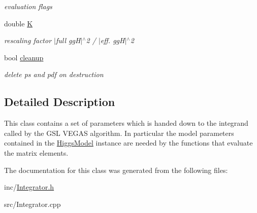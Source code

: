 \begin{DoxyCompactItemize}
\begin{DoxyCompactList}\small\item\em evaluation flags \end{DoxyCompactList}\item 
\hypertarget{classintegrand__par_afae7075055e10bd188d53fe2e1edd1e3}{double \hyperlink{classintegrand__par_afae7075055e10bd188d53fe2e1edd1e3}{K}}\label{classintegrand__par_afae7075055e10bd188d53fe2e1edd1e3}

\begin{DoxyCompactList}\small\item\em rescaling factor $\vert$full gg\-H$\vert$$^\wedge$2 / $\vert$eff. gg\-H$\vert$$^\wedge$2 \end{DoxyCompactList}\item 
\hypertarget{classintegrand__par_a1655b43b8c9e09a8bfbab014375aca49}{bool \hyperlink{classintegrand__par_a1655b43b8c9e09a8bfbab014375aca49}{cleanup}}\label{classintegrand__par_a1655b43b8c9e09a8bfbab014375aca49}

\begin{DoxyCompactList}\small\item\em delete ps and pdf on destruction \end{DoxyCompactList}\end{DoxyCompactItemize}


\subsection{Detailed Description}
This class contains a set of parameters which is handed down to the integrand called by the G\-S\-L V\-E\-G\-A\-S algorithm. In particular the model parameters contained in the \hyperlink{classHiggsModel}{Higgs\-Model} instance are needed by the functions that evaluate the matrix elements. 

The documentation for this class was generated from the following files\-:\begin{DoxyCompactItemize}
\item 
inc/\hyperlink{Integrator_8h}{Integrator.\-h}\item 
src/Integrator.\-cpp\end{DoxyCompactItemize}
